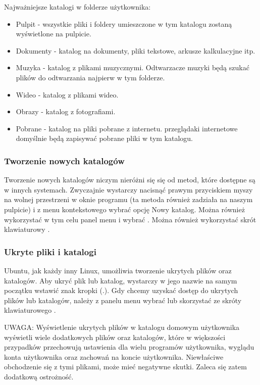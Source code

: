 Najważniejsze katalogi w folderze użytkownika:
\begin{itemize}
\item \textcolor{ubuntu_orange}{Pulpit} - wszystkie pliki i foldery umieszczone w tym katalogu zostaną wyświetlone na pulpicie.
\item \textcolor{ubuntu_orange}{Dokumenty} - katalog na dokumenty, pliki tekstowe, arkusze kalkulacyjne itp.
\item \textcolor{ubuntu_orange}{Muzyka} - katalog z plikami muzycznymi. Odtwarzacze muzyki będą szukać plików do odtwarzania najpierw w tym folderze.
\item \textcolor{ubuntu_orange}{Wideo} - katalog z plikami wideo.
\item \textcolor{ubuntu_orange}{Obrazy} - katalog z fotografiami.
\item \textcolor{ubuntu_orange}{Pobrane} - katalog na pliki pobrane z internetu. przeglądaki internetowe domyślnie będą zapisywać pobrane pliki w tym katalogu.
\end{itemize}

\subsubsection{Tworzenie nowych katalogów}
Tworzenie nowych katalogów niczym nieróżni się się od metod, które dostępne są w innych systemach. Zwyczajnie wystarczy nacisnąć prawym przyciskiem myszy na wolnej przestrzeni w oknie programu (ta metoda również zadziała na naszym pulpicie) i z menu kontekstowego wybrać opcję \textcolor{ubuntu_orange}{Nowy katalog}. Można również wykorzystać w tym celu panel menu i wybrać . Można również wykorzystać skrót klawiaturowy .

\subsubsection{Ukryte pliki i katalogi}
Ubuntu, jak każdy inny Linux, umożliwia tworzenie ukrytych plików oraz katalogów. Aby ukryć plik lub katalog, wystarczy w jego nazwie na samym początku wstawić znak kropki (.). Gdy chcemy uzyskać dostęp do ukrytych plików lub katalogów, należy z panelu menu wybrać  lub skorzystać ze skróty klawiaturowego .

UWAGA: Wyświetlenie ukrytych plików w katalogu domowym użytkownika wyświetli wiele dodatkowych plików oraz katalogów, które w większości przypadków przechowują ustawienia dla wielu programów użytkownika, wyglądu konta użytkownika oraz zachowań na koncie użytkownika. Niewłaściwe obchodzenie się z tymi plikami, może mieć negatywne skutki. Zaleca się zatem dodatkową ostrożność.

